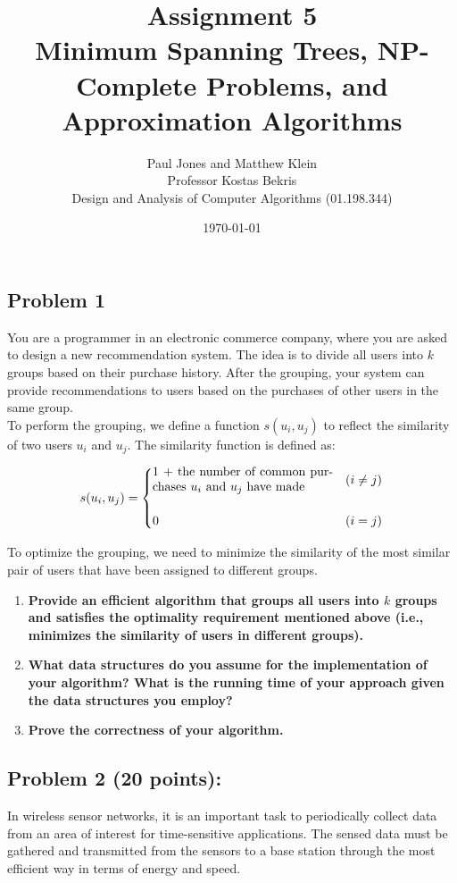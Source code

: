 \documentclass[11pt]{article}
\title{Assignment 5 \\ Minimum Spanning Trees, NP-Complete Problems, and Approximation Algorithms}
\author{Paul Jones and Matthew Klein \\
		Professor Kostas Bekris\\
		Design and Analysis of Computer Algorithms (01.198.344)}
\date{\today}
\begin{document}
\maketitle
\clearpage

\subsection*{Problem 1} You are a programmer in an
electronic commerce company, where you are asked to design a new
recommendation system. The idea is to divide all users into $k$ groups
based on their purchase history. After the grouping, your system can
provide recommendations to users based on the purchases of other users
in the same group.\\

\noindent To perform the grouping, we define a function $s(u_i, u_j)$
to reflect the similarity of two users $u_i$ and $u_j$. The similarity
function is defined as: \vspace{-0.05in}

$$
s(u_i, u_j) = \begin{cases}
  \parbox{2in}{1 + the number of common purchases $u_i$ and $u_j$ have made} & 
  (i \neq j) \\
    \\
  0 & (i = j)
\end{cases}
$$

\noindent To optimize the grouping, we need to minimize the similarity
of the most similar pair of users that have been assigned to different
groups.\\

\begin{enumerate}[label=\textbf{(\alph*)}]
\item \textbf{Provide an efficient algorithm that groups all users
into $k$ groups and satisfies the optimality requirement mentioned
above (i.e., minimizes the similarity of users in different groups).}

\item \textbf{What data structures do you assume for the
implementation of your algorithm?  What is the running time of your
approach given the data structures you employ?}

\item \textbf{Prove the correctness of your algorithm.}
\end{enumerate}

\subsection*{Problem 2 (20 points):} In wireless sensor networks, it
is an important task to periodically collect data from an area of
interest for time-sensitive applications. The sensed data must be
gathered and transmitted from the sensors to a base station through
the most efficient way in terms of energy and speed.\\
\end{document}
